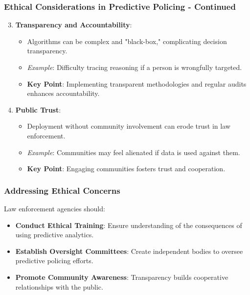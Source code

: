 \documentclass[aspectratio=169]{beamer}
\begin{document}
\begin{frame}[fragile]
    \frametitle{Ethical Considerations in Predictive Policing - Continued}
    \begin{enumerate}
        \setcounter{enumi}{2}
        \item \textbf{Transparency and Accountability}:
            \begin{itemize}
                \item Algorithms can be complex and "black-box," complicating decision transparency.
                \item \textit{Example}: Difficulty tracing reasoning if a person is wrongfully targeted.
                \item \textbf{Key Point}: Implementing transparent methodologies and regular audits enhances accountability.
            \end{itemize}
        
        \item \textbf{Public Trust}:
            \begin{itemize}
                \item Deployment without community involvement can erode trust in law enforcement.
                \item \textit{Example}: Communities may feel alienated if data is used against them.
                \item \textbf{Key Point}: Engaging communities fosters trust and cooperation.
            \end{itemize}
    \end{enumerate}
\end{frame}

\begin{frame}[fragile]
    \frametitle{Addressing Ethical Concerns}
    Law enforcement agencies should:
    \begin{itemize}
        \item \textbf{Conduct Ethical Training}: Ensure understanding of the consequences of using predictive analytics.
        \item \textbf{Establish Oversight Committees}: Create independent bodies to oversee predictive policing efforts.
        \item \textbf{Promote Community Awareness}: Transparency builds cooperative relationships with the public.
    \end{itemize}
\end{frame}
\end{document}

